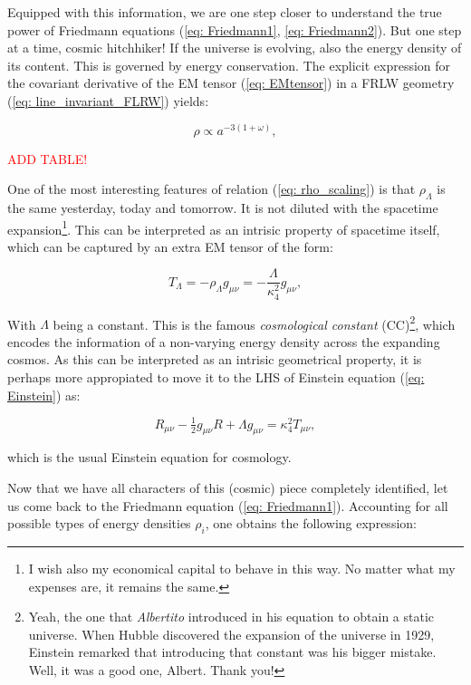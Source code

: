 \documentclass[11pt, a4paper]{article} %
\begin{document}
Equipped with this information, we are one step closer to understand the true power of Friedmann equations (\ref{eq: Friedmann1}, \ref{eq: Friedmann2}). But one step at a time, cosmic hitchhiker! If the universe is evolving, also the energy density of its content. This is governed by energy conservation. The explicit expression for the covariant derivative of the EM tensor (\ref{eq: EMtensor}) in a FRLW geometry (\ref{eq: line_invariant_FLRW}) yields:

\begin{equation}\label{eq: rho_scaling}
	\rho \propto a^{-3\left(1+\omega\right)},
\end{equation}

\textcolor{red}{ADD TABLE!}

One of the most interesting features of relation (\ref{eq: rho_scaling}) is that $\rho_{\Lambda}$ is the same yesterday, today and tomorrow. It is not diluted with the spacetime expansion\footnote{I wish also my economical capital to behave in this way. No matter what my expenses are, it remains the same.}. This can be interpreted as an intrisic property of spacetime itself, which can be captured by an extra EM tensor of the form:

\begin{equation}
	T_{\Lambda} = - \rho_{\Lambda}g_{\mu\nu} = - \frac{\Lambda}{\kappa^{2}_{4}} g_{\mu\nu},
\end{equation}

With $\Lambda$ being a constant. This is the famous \textit{cosmological constant} (CC)\footnote{Yeah, the one that \textit{Albertito} introduced in his equation to obtain a static universe. When Hubble discovered the expansion of the universe in 1929, Einstein remarked that introducing that constant was his bigger mistake. Well, it was a good one, Albert. Thank you!}, which encodes the information of a non-varying energy density across the expanding cosmos. As this can be interpreted as an intrisic geometrical property, it is perhaps more appropiated to move it to the LHS of Einstein equation (\ref{eq: Einstein}) as: 

\begin{equation}\label{eq: Einstein with Lambda}
	R_{\mu\nu} - \tfrac{1}{2} g_{\mu\nu} R + \Lambda g_{\mu\nu}  = \kappa^{2}_{4} T_{\mu \nu},
\end{equation}

which is the usual Einstein equation for cosmology. 

Now that we have all characters of this (cosmic) piece completely identified, let us come back to the Friedmann equation (\ref{eq: Friedmann1}). Accounting for all possible types of energy densities $\rho_{i}$, one obtains the following expression:
\end{document}
